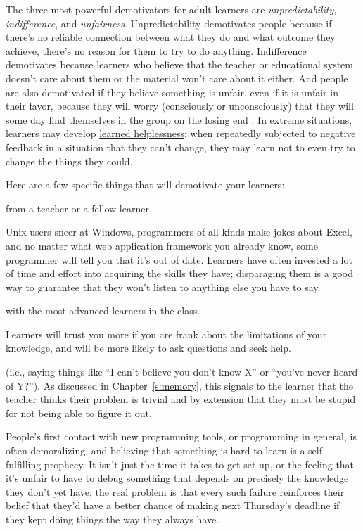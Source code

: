 The three most powerful demotivators for adult learners are
\emph{unpredictability}, \emph{indifference}, and \emph{unfairness}. Unpredictability
demotivates people because if there's no reliable connection between
what they do and what outcome they achieve, there's no reason for them
to try to do anything. Indifference demotivates because learners who
believe that the teacher or educational system doesn't care about them
or the material won't care about it either. And people are also
demotivated if they believe something is unfair, even if it is unfair in
their favor, because they will worry (consciously or unconsciously) that
they will some day find themselves in the group on the losing end
\cite{Wilk2011}. In extreme situations, learners may develop
\protect\hyperlink{g:learned-helplessness}{learned helplessness}: when
repeatedly subjected to negative feedback in a situation that they can't
change, they may learn not to even try to change the things they could.

Here are a few specific things that will demotivate your learners:

\begin{description}
\tightlist
\item[A holier-than-thou or contemptuous attitude]
from a teacher or a fellow learner.
\item[Telling them that their existing skills are rubbish.]
Unix users sneer at Windows, programmers of all kinds make jokes
about Excel, and no matter what web application framework you
already know, some programmer will tell you that it's out of date.
Learners have often invested a lot of time and effort into acquiring
the skills they have; disparaging them is a good way to guarantee
that they won't listen to anything else you have to say.
\item[Diving into complex or detailed technical discussion]
with the most advanced learners in the class.
\item[Pretending that you know more than you do.]
Learners will trust you more if you are frank about the limitations
of your knowledge, and will be more likely to ask questions and seek
help.
\item[Using the J word (``just'') or feigning surprise]
(i.e., saying things like ``I can't believe you don't know X'' or
``you've never heard of Y?''). As discussed in
Chapter~\ref{s:memory}, this signals to the learner that the teacher
thinks their problem is trivial and by extension that they must be
stupid for not being able to figure it out.
\item[Software installation headaches.]
People's first contact with new programming tools, or programming in
general, is often demoralizing, and believing that something is hard
to learn is a self-fulfilling prophecy. It isn't just the time it
takes to get set up, or the feeling that it's unfair to have to
debug something that depends on precisely the knowledge they don't
yet have; the real problem is that every such failure reinforces
their belief that they'd have a better chance of making next
Thursday's deadline if they kept doing things the way they always
have.
\end{description}

